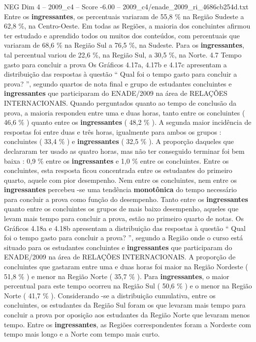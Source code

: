 \begin{textsample}{NEG Dim 4 – 2009\_c4 – Score -6.00 – 2009\_c4/enade\_2009\_ri\_4686cb254d.txt}
Entre os \textbf{ingressantes}, os percentuais variaram de 55,8 \% na Região Sudeste a 62,8 \%, na Centro-Oeste.
Em todas as Regiões, a maioria dos concluintes afirmou ter estudado e aprendido todos ou muitos dos conteúdos, com percentuais que variaram de 68,6 \% na Região Sul a 76,5 \%, na Sudeste.
Para os \textbf{ingressantes}, tal percentual variou de 22,6 \%, na Região Sul, a 30,5 \%, na Norte. 4.7 Tempo gasto para concluir a prova Os Gráficos 4.17a, 4.17b e 4.17c apresentam a distribuição das respostas à questão “ Qual foi o tempo gasto para concluir a prova? ”, segundo quartos de nota final e grupo de estudantes concluintes e \textbf{ingressantes} que participaram do ENADE/2009 na área de RELAÇÕES INTERNACIONAIS.
Quando perguntados quanto ao tempo de conclusão da prova, a maioria respondeu entre uma e duas horas, tanto entre os concluintes ( 46,6 \% ) quanto entre os \textbf{ingressantes} ( 48,2 \% ).
A segunda maior incidência de respostas foi entre duas e três horas, igualmente para ambos os grupos : concluintes ( 33,4 \% ) e \textbf{ingressantes} ( 32,5 \% ).
A proporção daqueles que declararam ter usado as quatro horas, mas não ter conseguido terminar foi bem baixa : 0,9 \% entre os \textbf{ingressantes} e 1,0 \% entre os concluintes.
Entre os concluintes, esta resposta ficou concentrada entre os estudantes do primeiro quarto, aquele com pior desempenho.
Nem entre os concluintes, nem entre os \textbf{ingressantes} percebeu -se uma tendência \textbf{monotônica} do tempo necessário para concluir a prova como função do desempenho.
Tanto entre os \textbf{ingressantes} quanto entre os concluintes os grupos de mais baixo desempenho, aqueles que levam mais tempo para concluir a prova, estão no primeiro quarto de notas.
Os Gráficos 4.18a e 4.18b apresentam a distribuição das respostas à questão “ Qual foi o tempo gasto para concluir a prova? ”, segundo a Região onde o curso está situado para os estudantes concluintes e \textbf{ingressantes} que participaram do ENADE/2009 na área de RELAÇÕES INTERNACIONAIS.
A proporção de concluintes que gastaram entre uma e duas horas foi maior na Região Nordeste ( 51,8 \% ) e menor na Região Norte ( 35,7 \% ).
Para \textbf{ingressantes}, o maior percentual para este tempo ocorreu na Região Sul ( 50,6 \% ) e o menor na Região Norte ( 41,7 \% ).
Considerando -se a distribuição cumulativa, entre os concluintes, os estudantes da Região Sul foram os que levaram mais tempo para concluir a prova por oposição aos estudantes da Região Norte que levaram menos tempo.
Entre os \textbf{ingressantes}, as Regiões correspondentes foram a Nordeste com tempo mais longo e a Norte com tempo mais curto.

\end{textsample}
